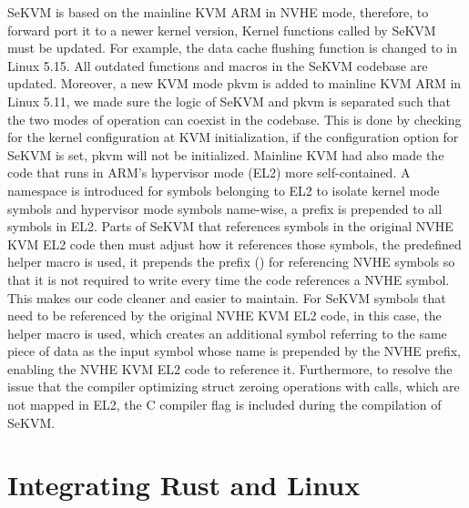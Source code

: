 SeKVM is based on the mainline KVM ARM in NVHE mode, therefore, to forward port
it to a newer kernel version, Kernel functions called by SeKVM must be updated. For example,
the data cache flushing function  is changed to
 in Linux 5.15.
All outdated functions and macros in the SeKVM codebase are updated.
Moreover, a new KVM mode pkvm \cite{pkvm} is added to mainline KVM ARM in Linux
5.11, we made sure the logic of SeKVM and pkvm is separated such that the two
modes of operation can coexist in the codebase. This is done by checking for
the kernel configuration at KVM initialization, if the configuration option for
SeKVM is set, pkvm will not be initialized.
Mainline KVM had also made the code that runs in ARM's hypervisor mode (EL2)
more self-contained. A namespace is introduced for symbols belonging to EL2 to
isolate kernel mode symbols and hypervisor mode symbols name-wise, a prefix
 is prepended to all symbols in EL2.
Parts of SeKVM that references symbols in the original NVHE KVM EL2 code then
must adjust how it references those symbols, the predefined helper macro
 is used, it prepends the prefix ()
for referencing NVHE symbols so that it is not required to write
 every time the code references a NVHE symbol. This makes
our code cleaner and easier to maintain. For SeKVM symbols that
need to be referenced by the original NVHE KVM EL2 code, in this case, the helper
macro  is used, which creates an additional symbol referring to the
same piece of data as the input symbol whose name is prepended by the NVHE
prefix, enabling the NVHE KVM EL2 code to reference it.
Furthermore, to resolve the issue that the compiler optimizing struct zeroing
operations with  calls, which are not mapped in EL2, the C
compiler flag  is included during the compilation of
SeKVM.

\section{Integrating Rust and Linux}

%

